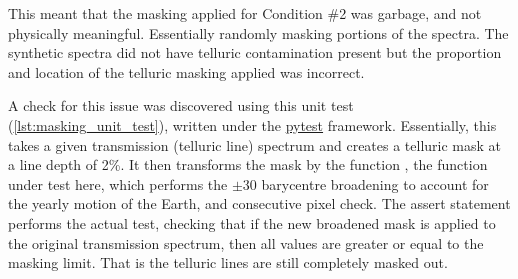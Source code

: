 This meant that the masking applied for Condition \#2 was garbage, and not physically meaningful.
Essentially randomly masking portions of the spectra.
The synthetic spectra did not have telluric contamination present but the proportion and location of the telluric masking applied was incorrect.

A check for this issue was discovered using this unit test (\cref{lst:masking_unit_test}), written under the \href{https://docs.pytest.org}{pytest} framework.
Essentially, this takes a given transmission (telluric line) spectrum and creates a telluric mask at a line depth of 2\%.
It then transforms the mask by the function , the function under test here, which performs the \(\pm30\)\kmps{} barycentre broadening to account for the yearly motion of the Earth, and consecutive pixel check.
The assert statement performs the actual test, checking that if the new broadened mask is applied to the original transmission spectrum, then all values are greater or equal to the masking limit.
That is the telluric lines are still completely masked out.

